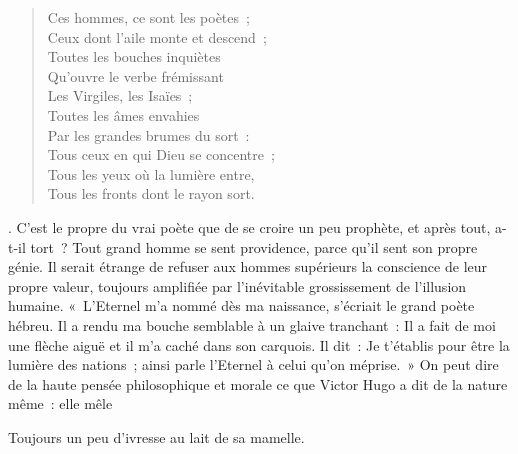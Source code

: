 \documentclass[french,twoside]{book} %
\newenvironment{quoteblock}%
  {\begin{quoting}}
  {\end{quoting}}
\newenvironment{quotebar}{%
    \def\FrameCommand{{\color{rubric!10!}\vrule width 0.5em} \hspace{0.9em}}%
    \def\OuterFrameSep{\itemsep} %
    \MakeFramed {\advance\hsize-\width \FrameRestore}
  }%
  {%
    \endMakeFramed
  }
\renewenvironment{quoteblock}%
  {%
    \savenotes
    \setstretch{0.9}
    \normalfont
    \begin{quotebar}
  }
  {%
    \end{quotebar}
    \spewnotes
  }
\begin{document}
{{\begin{verse}
Ces hommes, ce sont les poètes ;\\
Ceux dont l’aile monte et descend ;\\
Toutes les bouches inquiètes\\
Qu’ouvre le verbe frémissant\\
Les Virgiles, les Isaïes ;\\
Toutes les âmes envahies\\
Par les grandes brumes du sort :\\
Tous ceux en qui Dieu se concentre ;\\
Tous les yeux où la lumière entre,\\
Tous les fronts dont le rayon sort.\\
\end{verse}
}}. C’est le propre du vrai poète que de se croire un peu prophète, et après tout, a-t-il tort ? Tout grand homme se sent providence, parce qu’il sent son propre génie. Il serait étrange de refuser aux hommes supérieurs la conscience de leur propre valeur, toujours amplifiée par l’inévitable grossissement de l’illusion humaine. « L’Eternel m’a nommé dès ma naissance, s’écriait le grand poète hébreu. Il a rendu ma bouche semblable à un glaive tranchant : Il a fait de moi une flèche aiguë et il m’a caché dans son carquois. Il dit : Je t’établis pour être la lumière des nations ; ainsi parle l’Eternel à celui qu’on méprise. » On peut dire de la haute pensée philosophique et morale ce que Victor Hugo a dit de la nature même : elle mêle\par

\begin{quoteblock}
 \noindent Toujours un peu d’ivresse au lait de sa mamelle.
 \end{quoteblock}
\end{document}
